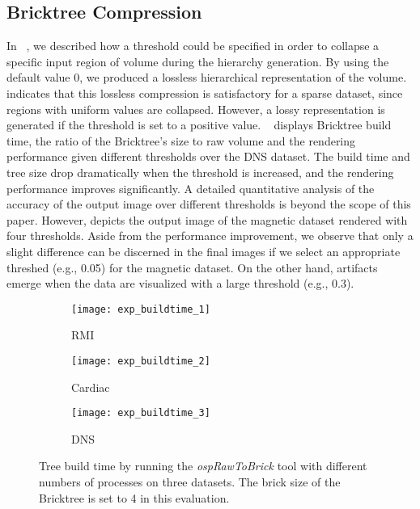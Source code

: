 \subsection{Bricktree Compression}
In ~, we described how a threshold could be specified 
in order to collapse a specific input region of volume during the hierarchy generation.
By using the default value 0, we produced a lossless hierarchical representation of
the volume.  indicates that this lossless compression
is satisfactory for a sparse dataset, since regions with uniform values
are collapsed. However, a lossy representation is generated if the threshold is
set to a positive value. ~ displays Bricktree build time,
the ratio of the Bricktree's size to raw volume and the rendering performance given different 
thresholds over the DNS dataset. The build time and tree size drop dramatically when 
the threshold is increased, and the rendering performance improves significantly. 
A detailed quantitative analysis of the accuracy of the output image over different 
thresholds is beyond the scope of this paper.
However, 
depicts the output image of the magnetic dataset rendered with four thresholds. Aside from the performance improvement, 
we observe that only a slight difference can be discerned in the final images if we select an appropriate threshed (e.g., 0.05) for the magnetic dataset.
On the other hand, artifacts emerge when the data are visualized with a large threshold (e.g., 0.3).

\begin{figure}[h]
    \centering
    \begin{subfigure}[b]{0.32\columnwidth}
        \texttt{[image: exp\_buildtime\_1]}
        \vspace{-1.5em}
        \caption{RMI}
        \label{fig:exp_buildtime_1}
    \end{subfigure}
    \begin{subfigure}[b]{0.32\columnwidth}
        \texttt{[image: exp\_buildtime\_2]}
        \vspace{-1.5em}
        \caption{Cardiac}
        \label{fig:exp_buildtime_2}
    \end{subfigure}
    \begin{subfigure}[b]{0.32\columnwidth}
        \texttt{[image: exp\_buildtime\_3]}
        \vspace{-1.5em}
        \caption{DNS}
        \label{fig:exp_buildtime_3}
    \end{subfigure}
   
	\caption{\label{fig:exp_buildtime}%
	Tree build time by running the \textit{ospRawToBrick} tool with different numbers of processes on three datasets. The brick size of the Bricktree is set to 4 in this evaluation.}
	\vspace{-0.5em}
\end{figure}

